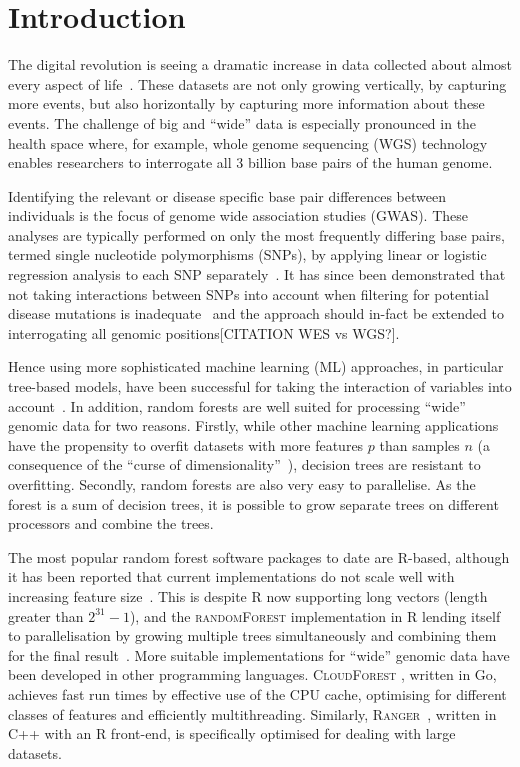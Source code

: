 \documentclass[10pt,letterpaper]{article}
\newcommand{\ranger}{\textsc{Ranger}\xspace}
\newcommand{\randomforest}{\textsc{randomForest}\xspace}
\begin{document}
\linenumbers

\section{Introduction}
The digital revolution is seeing a dramatic increase in data collected about almost every aspect of
life~\cite{Loebbecke2015}.  These datasets are not only growing vertically, by capturing more events, but also
horizontally by capturing more information about these events.  The challenge of big and ``wide'' data is especially
pronounced in the health space where, for example, whole genome sequencing (WGS) technology enables researchers to
interrogate all 3 billion base pairs of the human genome.

Identifying the relevant or disease specific base pair differences between individuals is the focus of genome wide
association studies (GWAS).  These analyses are typically performed on only the most frequently differing base pairs,
termed single nucleotide polymorphisms (SNPs), by applying linear or logistic regression analysis to each SNP
separately~\cite{CCC2007}.  It has since been demonstrated that not taking interactions between SNPs into account
when filtering for potential disease mutations is inadequate~\cite{Manolio2009,Yang2011} and the approach should 
in-fact be extended to interrogating all genomic positions[CITATION WES vs WGS?].

Hence using more sophisticated machine learning (ML) approaches, in particular tree-based models, have been successful
for taking the interaction of variables into account~\cite{Wright.et.al.2016}. In addition, random forests are well
suited for processing ``wide'' genomic data for two reasons.  Firstly, while other machine learning applications have
the propensity to overfit datasets with more features $p$ than samples $n$ (a consequence of the ``curse of
dimensionality''~\cite{Bauer2014, bellman1961adaptive}), decision trees are resistant to overfitting.  Secondly, random
forests are also very easy to parallelise. As the forest is a sum of decision trees, it is possible to grow separate
trees on different processors and combine the trees. 

The most popular random forest software packages to date are R-based, although it has been reported that current implementations 
do not scale well with increasing feature size~\cite{Wright.and.Ziegle.2016}.  This is despite R now supporting long vectors (length greater
than $2^{31}-1$), and the \randomforest implementation in R lending itself to parallelisation by growing multiple
trees simultaneously and combining them for the final result~\cite{Liaw.and.Weiner.2002}.  More suitable implementations for ``wide''
genomic data have been developed in other programming languages. \textsc{CloudForest} \cite{Bressler2015}, written in Go,
achieves fast run times by effective use of the CPU cache, optimising for different classes of features and efficiently
multithreading.  Similarly, \ranger~\cite{Wright.and.Ziegle.2016}, written in C++ with an R front-end, is
specifically optimised for dealing with large datasets.
\end{document}
